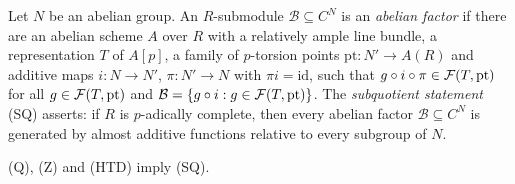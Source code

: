 \begin{definition}\label{pf:tower:def-abfactor}
Let $N$ be an abelian group. An $R$-submodule $\mathcal B\subseteq C^N$ is an \emph{abelian factor} if there are an abelian
scheme $A$ over $R$ with a relatively ample line bundle, a representation $T$ of $A[p]$, a family of $p$-torsion points
$\mathrm{pt}\colon N'\to A(R)$ and additive maps $i\colon N\to N'$, $\pi\colon N'\to N$ with $\pi i=\mathrm{id}$, such
that $g\circ i\circ\pi\in\mathcal F(T,\mathrm{pt})$ for all $g\in\mathcal F(T,\mathrm{pt})$ and
$\mathcal B=\{g\circ i:g\in\mathcal F(T,\mathrm{pt})\}$. The \emph{subquotient statement} (SQ) asserts: if $R$ is
$p$-adically complete, then every abelian factor $\mathcal B\subseteq C^N$ is generated by almost additive functions
relative to every subgroup of $N$.
\end{definition}

\begin{theorem}\label{pf:tower:subquot}
\textup{(Q)}, \textup{(Z)} and \textup{(HTD)} imply \textup{(SQ)}.
\end{theorem}


